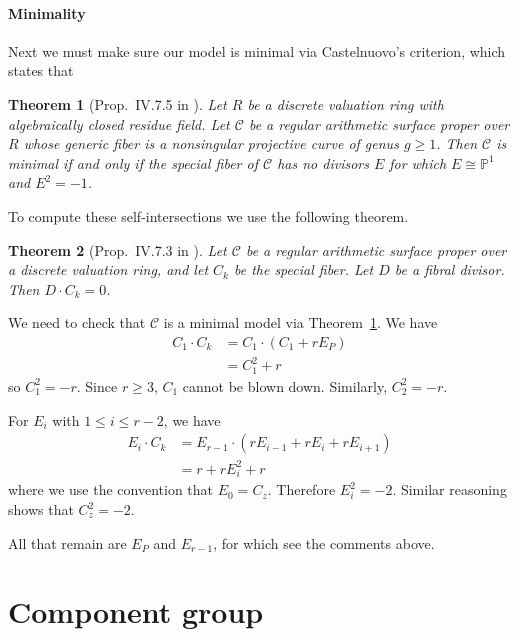 \documentclass{article}
\newcommand{\scd}{\mathscr{C}}
\theoremstyle{plain}
\newtheorem{theorem}{Theorem}[section]
\theoremstyle{definition}
\theoremstyle{remark}
\newcommand{\isom}{\cong}
\newcommand{\Pro}{\ensuremath{\mathbb{P}}}
\begin{document}
\paragraph{Minimality}
\label{sec:minimality}

Next we must make sure our model is minimal via Castelnuovo's criterion, which states that
\begin{theorem}[Prop.~IV.7.5 in \cite{silvermanATAEC}]\label{thm:castelnuovo}
  Let $R$ be a discrete valuation ring with algebraically closed residue field. Let $\scd$ be a regular arithmetic surface proper over $R$ whose generic fiber is a nonsingular projective curve of genus $g \geq 1$. Then $\scd$ is minimal if and only if the special fiber of $\scd$ has no divisors $E$ for which $E \isom \Pro^1$ and $E^2 = -1$.
\end{theorem}

To compute these self-intersections we use the following theorem.
\begin{theorem}[Prop.~IV.7.3 in \cite{silvermanATAEC}]\label{thm:fibral-intersect-total}
  Let $\scd$ be a regular arithmetic surface proper over a discrete valuation ring, and let $C_k$ be the special fiber. Let $D$ be a fibral divisor. Then $D \cdot C_k = 0$.
\end{theorem}

We need to check that $\scd$ is a minimal model via Theorem~\ref{thm:castelnuovo}. We have
\begin{align*}
  C_1 \cdot C_k &= C_1 \cdot (C_1 + rE_{P}) \\
  &= C_1^2 + r
\end{align*}
so $C_1^2 = -r$. Since $r \geq 3$, $C_1$ cannot be blown down. Similarly, $C_2^2 = -r$.

For $E_{i}$ with $1 \leq i \leq r-2$, we have
\begin{align*}
  E_{i} \cdot C_k &= E_{r-1} \cdot (rE_{i-1} + rE_{i} + rE_{i+1}) \\
  &= r + rE_i^2 + r
\end{align*}
where we use the convention that $E_0 = C_z$. Therefore $E_i^2 = -2$. Similar reasoning shows that $C_z^2 = -2$.

All that remain are $E_P$ and $E_{r-1}$, for which see the comments above.

\section{Component group}
\label{sec:component-group}





\end{document}
